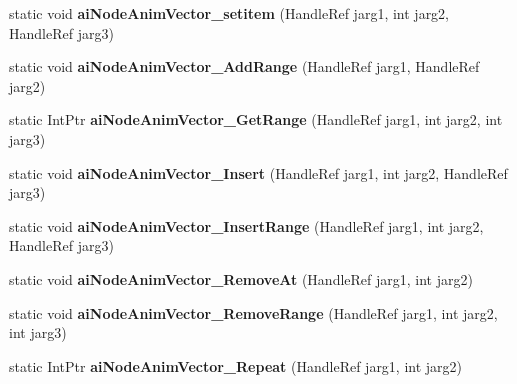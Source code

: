 \begin{DoxyCompactItemize}
\item 
\hypertarget{class_assimp_p_i_n_v_o_k_e_a12aef70b6823f35743921a24f41c99c2}{static void {\bfseries ai\+Node\+Anim\+Vector\+\_\+setitem} (Handle\+Ref jarg1, int jarg2, Handle\+Ref jarg3)}\label{class_assimp_p_i_n_v_o_k_e_a12aef70b6823f35743921a24f41c99c2}

\item 
\hypertarget{class_assimp_p_i_n_v_o_k_e_a2893ed611c192520710f9fbafa10a676}{static void {\bfseries ai\+Node\+Anim\+Vector\+\_\+\+Add\+Range} (Handle\+Ref jarg1, Handle\+Ref jarg2)}\label{class_assimp_p_i_n_v_o_k_e_a2893ed611c192520710f9fbafa10a676}

\item 
\hypertarget{class_assimp_p_i_n_v_o_k_e_a6c5c25785b5cbe9d91f938221a92873f}{static Int\+Ptr {\bfseries ai\+Node\+Anim\+Vector\+\_\+\+Get\+Range} (Handle\+Ref jarg1, int jarg2, int jarg3)}\label{class_assimp_p_i_n_v_o_k_e_a6c5c25785b5cbe9d91f938221a92873f}

\item 
\hypertarget{class_assimp_p_i_n_v_o_k_e_a9818bb4ae1913906b83fe9019dfcc92d}{static void {\bfseries ai\+Node\+Anim\+Vector\+\_\+\+Insert} (Handle\+Ref jarg1, int jarg2, Handle\+Ref jarg3)}\label{class_assimp_p_i_n_v_o_k_e_a9818bb4ae1913906b83fe9019dfcc92d}

\item 
\hypertarget{class_assimp_p_i_n_v_o_k_e_aab7f4e0299b0ff07182f05f4ed4e9c01}{static void {\bfseries ai\+Node\+Anim\+Vector\+\_\+\+Insert\+Range} (Handle\+Ref jarg1, int jarg2, Handle\+Ref jarg3)}\label{class_assimp_p_i_n_v_o_k_e_aab7f4e0299b0ff07182f05f4ed4e9c01}

\item 
\hypertarget{class_assimp_p_i_n_v_o_k_e_ae1599de387aa9d5277aba32fe7f98c7c}{static void {\bfseries ai\+Node\+Anim\+Vector\+\_\+\+Remove\+At} (Handle\+Ref jarg1, int jarg2)}\label{class_assimp_p_i_n_v_o_k_e_ae1599de387aa9d5277aba32fe7f98c7c}

\item 
\hypertarget{class_assimp_p_i_n_v_o_k_e_ade20f57d862f1b576c04f41417930518}{static void {\bfseries ai\+Node\+Anim\+Vector\+\_\+\+Remove\+Range} (Handle\+Ref jarg1, int jarg2, int jarg3)}\label{class_assimp_p_i_n_v_o_k_e_ade20f57d862f1b576c04f41417930518}

\item 
\hypertarget{class_assimp_p_i_n_v_o_k_e_af08f6a23f89cdc6752c936ebe9181fc6}{static Int\+Ptr {\bfseries ai\+Node\+Anim\+Vector\+\_\+\+Repeat} (Handle\+Ref jarg1, int jarg2)}\label{class_assimp_p_i_n_v_o_k_e_af08f6a23f89cdc6752c936ebe9181fc6}


\end{DoxyCompactItemize}
